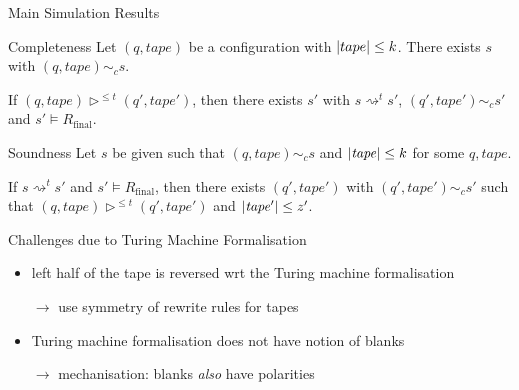 \documentclass[11pt,usenames,dvipsnames,
hyperref={pdfencoding=auto,psdextra}]{beamer}
\newcommand{\reprc}{\ensuremath{\sim_c}}
\newcommand{\Rfinal}{R_{\text{final}}}
\begin{document}
\begin{frame}{Main Simulation Results}
  \begin{block}{Completeness}
    Let $(q, \mathit{tape})$ be a configuration with $|tape| \le k$. There exists $s$ with $(q, \mathit{tape}) \reprc{} s$.

    If $(q, \mathit{tape}) \triangleright^{\le t} (q', \mathit{tape}')$, then there exists $s'$ with $s \rightsquigarrow^t s'$, $(q', \mathit{tape}') \reprc{} s'$ and $s' \models \Rfinal$. 
  \end{block}

  \begin{block}{Soundness}
    Let $s$ be given such that $(q, \mathit{tape}) \reprc{} s$ and $|\mathit{tape}| \le k$ for some $q, \mathit{tape}$. 

    If $s \rightsquigarrow^t s'$ and $s' \models \Rfinal$, then there exists $(q', \mathit{tape}')$ with $(q', \mathit{tape}') \reprc{} s'$ such that $(q, \mathit{tape}) \triangleright^{\le t} (q', \mathit{tape}')$ and $|\mathit{tape}'| \le z'$. 
  \end{block}
\end{frame}

\begin{frame}{Challenges due to Turing Machine Formalisation}
  \begin{itemize}
    \item left half of the tape is reversed wrt the Turing machine formalisation

      $\rightarrow$ use symmetry of rewrite rules for tapes
    \item Turing machine formalisation does not have notion of blanks

      $\rightarrow$ mechanisation: blanks \emph{also} have polarities
  \end{itemize}
\end{frame}
\end{document}
